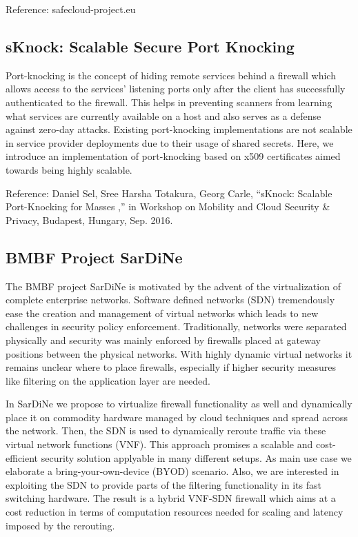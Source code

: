 Reference:
safecloud-project.eu

\subsection{sKnock: Scalable Secure Port Knocking}

Port-knocking  is  the  concept  of  hiding  remote  services behind   a
  firewall   which   allows   access   to   the   services’ listening
ports only after the client has successfully authenticated to  the
firewall.  This  helps  in  preventing  scanners  from  learning what
services  are  currently  available  on  a  host  and  also  serves as
a  defense  against  zero-day  attacks.  Existing  port-knocking
implementations are not scalable in service provider deployments due to
their usage of shared secrets. Here, we introduce an  implementation  of
port-knocking  based  on  x509  certificates aimed  towards  being
highly  scalable.

Reference:
Daniel Sel, Sree Harsha Totakura, Georg Carle, “sKnock: Scalable
Port-Knocking for Masses ,” in Workshop on Mobility and Cloud Security \&
Privacy, Budapest, Hungary, Sep. 2016.

\subsection{BMBF Project SarDiNe}

The BMBF project SarDiNe is motivated by the advent of the virtualization of
complete enterprise networks. Software defined networks (SDN) tremendously ease
the creation and management of virtual networks which leads to new challenges
in security policy enforcement. Traditionally, networks were separated
physically and security was mainly enforced by firewalls placed at gateway
positions between the physical networks. With highly dynamic virtual networks
it remains unclear where to place firewalls, especially if higher security
measures like filtering on the application layer are needed.

In SarDiNe we propose to virtualize firewall functionality as well and
dynamically place it on commodity hardware managed by cloud techniques and
spread across the network. Then, the SDN is used to dynamically reroute traffic
via these virtual network functions (VNF). This approach promises a scalable
and cost-efficient security solution applyable in many different setups. As main
use case we elaborate a bring-your-own-device (BYOD) scenario. Also, we are
interested in exploiting the SDN to provide parts of the filtering
functionality in its fast switching hardware. The result is a hybrid VNF-SDN
firewall which aims at a cost reduction in terms of computation resources
needed for scaling and latency imposed by the rerouting.

